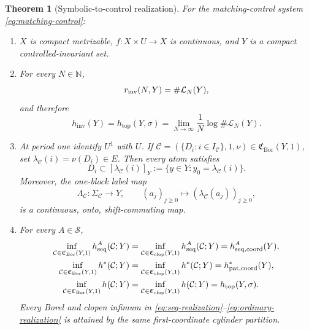 \documentclass[11pt,reqno]{amsart}
\numberwithin{equation}{section}
\newtheorem{theorem}{Theorem}[section]
\theoremstyle{definition}
\newcommand{\N}{\mathbb N}
\newcommand{\C}{\mathcal C}
\newcommand{\Lcal}{\mathcal L}
\newcommand{\hseq}{h_{\mathrm{seq}}}
\newcommand{\hpat}{h^{*}}
\newcommand{\hinv}{h_{\mathrm{inv}}}
\newcommand{\htop}{h_{\mathrm{top}}}
\newcommand{\Bor}{\mathrm{Bor}}
\newcommand{\clop}{\mathrm{clop}}
\begin{document}
\begin{theorem}[Symbolic-to-control realization]\label{thm:C}
For the matching-control system \eqref{eq:matching-control}:
\begin{enumerate}
\item $X$ is compact metrizable, $f:X\times U\to X$ is continuous, and $Y$
is a compact controlled-invariant set.
\item For every $N\in\N$,
\begin{equation}\label{eq:rinv-language}
 r_{\rm inv}(N,Y)=\#\Lcal_N(Y),
\end{equation}
and therefore
\begin{equation}\label{eq:hinv-htop}
 \hinv(Y)=\htop(Y,\sigma)
 =\lim_{N\to\infty}\frac1N\log\#\Lcal_N(Y).
\end{equation}
\item At period one identify $U^1$ with $U$.  If
$\C=(\{D_i:i\in I_\C\},1,\nu)\in\mathfrak C_{\Bor}(Y,1)$, set
$\lambda_\C(i)=\nu(D_i)\in E$.  Then every atom satisfies
\begin{equation}\label{eq:atom-cylinder}
 D_i\subset[\lambda_\C(i)]_Y
 :=\{y\in Y:y_0=\lambda_\C(i)\}.
\end{equation}
Moreover, the one-block label map
\begin{equation}\label{eq:label-factor}
 \Lambda_\C:\Sigma_\C\longrightarrow Y,
 \qquad (a_j)_{j\ge0}\longmapsto(\lambda_\C(a_j))_{j\ge0},
\end{equation}
is a continuous, onto, shift-commuting map.
\item For every $A\in\mathscr S$,
\begin{align}
 \inf_{\C\in\mathfrak C_{\Bor}(Y,1)}\hseq^A(\C;Y)
 &=\inf_{\C\in\mathfrak C_{\clop}(Y,1)}\hseq^A(\C;Y)
 =h_{\rm seq,coord}^A(Y),
 \label{eq:seq-realization}\\
 \inf_{\C\in\mathfrak C_{\Bor}(Y,1)}\hpat(\C;Y)
 &=\inf_{\C\in\mathfrak C_{\clop}(Y,1)}\hpat(\C;Y)
 =h_{\rm pat,coord}^*(Y),
 \label{eq:pat-realization}\\
 \inf_{\C\in\mathfrak C_{\Bor}(Y,1)}h(\C;Y)
 &=\inf_{\C\in\mathfrak C_{\clop}(Y,1)}h(\C;Y)
 =\htop(Y,\sigma).
 \label{eq:ordinary-realization}
\end{align}
Every Borel and clopen infimum in
\eqref{eq:seq-realization}--\eqref{eq:ordinary-realization} is attained by
the same first-coordinate cylinder partition.
\end{enumerate}
\end{theorem}
\end{document}
